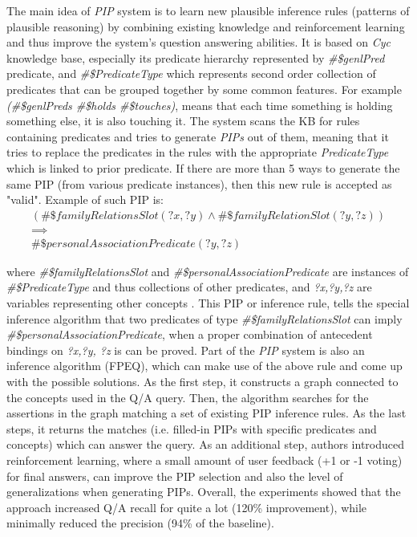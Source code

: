 \label{section:rw_PIP}
The main idea of \emph{PIP} system is to learn new plausible inference rules 
(patterns of plausible reasoning) by combining existing knowledge and 
reinforcement learning and thus improve the system's question answering
abilities\parencite{Sharma2010}. It is based on \emph{Cyc} knowledge base,
especially its predicate hierarchy represented by \emph{\#\$genlPred} predicate, 
and \emph{\#\$PredicateType} which represents second order collection of predicates 
that can be grouped together by some common features. For example
\emph{(\#\$genlPreds \#\$holds \#\$touches)}, means that each time something is 
holding something else, it is also touching it. The system scans the KB for rules 
containing predicates and tries to generate \emph{PIPs} out of them, meaning
that it tries to replace the predicates in the rules with the appropriate
\emph{PredicateType} which is linked to prior predicate. If there are more
than 5 ways to generate the same PIP (from various predicate instances), then
this new rule is accepted as "valid". Example of such PIP is:
\begin{gather*}
(\#\$familyRelationsSlot(?x,?y) \land \#\$familyRelationSlot(?y,?z)) \\
\implies \\ 
\#\$personalAssociationPredicate(?y,?z)
\end{gather*}

where \emph{\#\$familyRelationsSlot} and \emph{\#\$personalAssociationPredicate}
are instances of \emph{\#\$PredicateType} and thus collections of other 
predicates, and \emph{?x,?y,?z} are variables representing other concepts
\parencite{Sharma2010}. This PIP or inference rule, tells the special inference
algorithm that two predicates of type \emph{\#\$familyRelationsSlot} can
imply \emph{\#\$personalAssociationPredicate}, when a proper combination
of antecedent bindings on \emph{?x,?y, ?z} is can be proved. Part of the 
\emph{PIP} system is also an inference algorithm (FPEQ), which can make use of 
the above rule and come up with the possible solutions. As the first step, it 
constructs a graph connected to the concepts used in the Q/A query. Then, the
algorithm searches for the assertions in the graph matching a set of existing
PIP inference rules. As the last steps, it returns the matches (i.e. filled-in
PIPs with specific predicates and concepts) which can answer the query.
As an additional step, authors introduced reinforcement learning, where a small
amount of user feedback (+1 or -1 voting) for final answers, can improve the
PIP selection and also the level of generalizations when generating PIPs.
Overall, the experiments showed that the approach increased Q/A recall for 
quite a lot (120\% improvement), while minimally reduced the precision (94\% of
the baseline)\parencite{Zang2013}.

